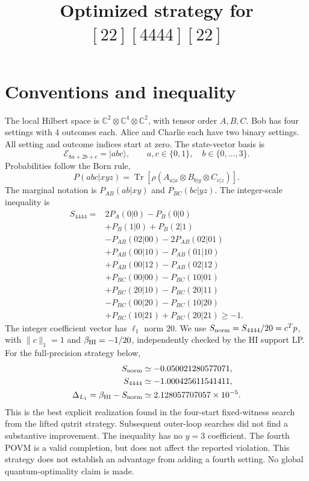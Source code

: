 \documentclass[11pt]{article}
\title{Optimized strategy for $[22][4444][22]$}
\author{}
\date{}
\begin{document}
\maketitle
\section{Conventions and inequality}
\label{app:4444_strategy}
The local Hilbert space is $\mathbb C^2\otimes\mathbb C^4\otimes\mathbb C^2$,
with tensor order $A,B,C$. Bob has four settings with 4 outcomes each.
Alice and Charlie each have two binary settings. All setting and outcome
indices start at zero. The state-vector basis is
\[
\mathcal E_{8a+2b+c}=|abc\rangle,\qquad a,c\in\{0,1\},\quad b\in\{0,\ldots,3\}.
\]
Probabilities follow the Born rule,
\[
P(abc|xyz)=\operatorname{Tr}\!\left[\rho
 (A_{a|x}\otimes B_{b|y}\otimes C_{c|z})\right].
\]
The marginal notation is $P_{AB}(ab|xy)$ and $P_{BC}(bc|yz)$.
The integer-scale inequality is
\begin{equation}
\begin{aligned}
S_{4444}={}&2P_{A}(0|0)-P_{B}(0|0)\\
&+P_{B}(1|0)+P_{B}(2|1)\\
&-P_{AB}(02|00)-2P_{AB}(02|01)\\
&+P_{AB}(00|10)-P_{AB}(01|10)\\
&+P_{AB}(00|12)-P_{AB}(02|12)\\
&+P_{BC}(00|00)-P_{BC}(10|01)\\
&+P_{BC}(20|10)-P_{BC}(20|11)\\
&-P_{BC}(00|20)-P_{BC}(10|20)\\
&+P_{BC}(10|21)+P_{BC}(20|21)\geq -1.
\end{aligned}
\end{equation}
The integer coefficient vector has $\ell_1$ norm $20$. We use
$S_{\rm norm}=S_{4444}/20=c^Tp$, with $\|c\|_1=1$ and
$\beta_{\rm HI}=-1/20$, independently checked by the HI support LP.
For the full-precision strategy below,
\[
\begin{aligned}
S_{\rm norm}&\simeq -0.050021280577071,\\
S_{4444}&\simeq -1.000425611541411,\\
\Delta_{L_1}=\beta_{\rm HI}-S_{\rm norm}&\simeq 2.128057707057\times10^{-5}.
\end{aligned}
\]
This is the best explicit realization found in the four-start fixed-witness
search from the lifted qutrit strategy. Subsequent outer-loop searches did
not find a substantive improvement.
The inequality has no $y=3$ coefficient. The fourth POVM is a valid
completion, but does not affect the reported violation. This strategy does
not establish an advantage from adding a fourth setting. No global
quantum-optimality claim is made.
\end{document}
